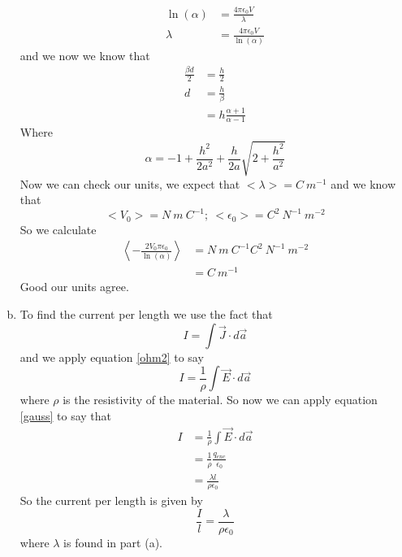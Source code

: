 \documentclass[11pt]{article}
\numberwithin{equation}{section}
\begin{document}
\begin{enumerate}[(a)]
\begin{align*}
\ln(\alpha) &= \frac{4\pi\epsilon_0V}{\lambda}\\ 
\lambda &= \frac{4\pi\epsilon_0V}{\ln(\alpha)} 
\end{align*}
and we now we know that 
\begin{align*}
\frac{\beta d}{2} &= \frac{h}{2}\\
d &= \frac{h}{\beta}\\
&= h\frac{\alpha+1}{\alpha-1}
\end{align*}
Where
$$\alpha = -1+\frac{h^2}{2a^2}+\frac{h}{2a}\sqrt{2+\frac{h^2}{a^2}}$$
Now we can check our units, we expect that $<\lambda> = C\ m^{-1}$ and we know that
$$<V_0> = N\ m\ C^{-1};\ <\epsilon_0> = C^2\ N^{-1}\ m^{-2}$$
So we calculate
\begin{align*}
\left<-\frac{2V_0\pi \epsilon_0}{\ln(\alpha)}\right> &= N\ m\ C^{-1} C^2\ N^{-1}\ m^{-2}\\ 
&=C\ m^{-1}
\end{align*}
Good our units agree.

\item
To find the current per length we use the fact that
$$I = \int\vec{J}\cdot d\vec{a}$$
and we apply equation \ref{ohm2} to say
$$I = \frac{1}{\rho}\int\vec{E}\cdot d\vec{a}$$
where $\rho$ is the resistivity of the material. So now we can apply equation \ref{gauss} to say that
\begin{align*}
I &= \frac{1}{\rho}\int\vec{E}\cdot d\vec{a}\\
&= \frac{1}{\rho}\frac{q_{enc}}{\epsilon_0}\\
&= \frac{\lambda l}{\rho\epsilon_0}
\end{align*}
So the current per length is given by
$$\frac{I}{l} = \frac{\lambda}{\rho\epsilon_0}$$
where $\lambda$ is found in part (a).

\end{enumerate}
\end{document}
